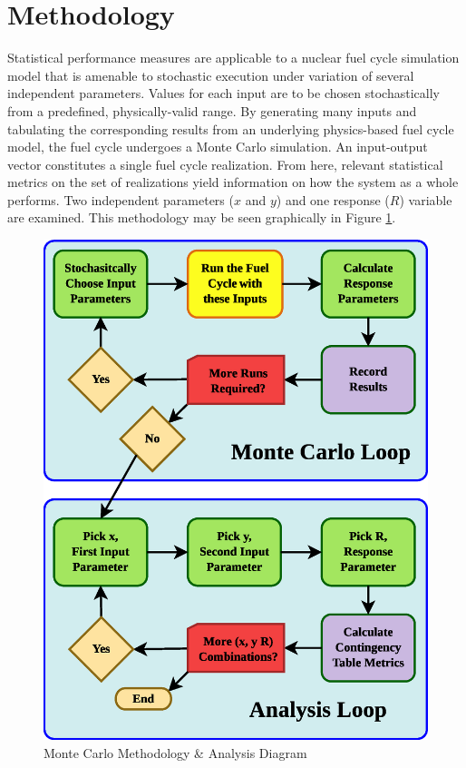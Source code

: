 \documentclass[a4paper, 12pt]{article}
\begin{document}
\section{Methodology}
\label{sec:methodology}

Statistical performance measures are applicable to a nuclear fuel cycle simulation model that
is amenable to stochastic execution under variation of several independent parameters.  Values
for each input are to be chosen stochastically from a predefined, physically-valid range.
By generating many inputs and tabulating the corresponding results from an underlying physics-based
fuel cycle model, the fuel cycle undergoes a Monte Carlo simulation.  An input-output vector
constitutes a single fuel cycle realization.  From here, relevant statistical metrics on the set of
realizations yield information on how the system as a whole performs.  
Two independent parameters ($x$ and $y$) and one response ($R$) variable are examined.
This methodology may be seen graphically in Figure \ref{mcmethod}.

\begin{figure}[htbp]
\begin{center}
\includegraphics[scale=0.70]{figs/MonteCarloMethodology.eps}
\caption{Monte Carlo Methodology \& Analysis Diagram}
\label{mcmethod}
\end{center}
\end{figure}
\end{document}
